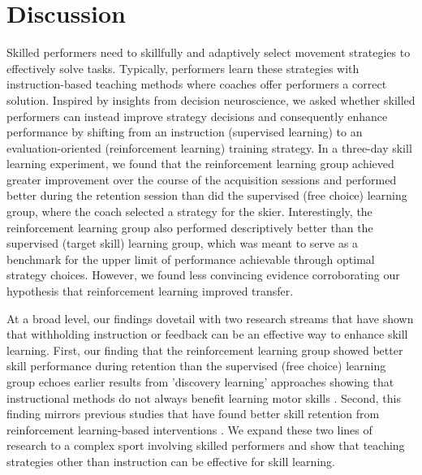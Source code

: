 \documentclass[pdflatex,sn-nature]{sn-jnl}%
\theoremstyle{thmstyleone}%
\theoremstyle{thmstyletwo}%
\theoremstyle{thmstylethree}%
\begin{document}
\section{Discussion}
Skilled performers need to skillfully and adaptively select movement strategies to effectively solve tasks. Typically, performers learn these strategies with instruction-based teaching methods where coaches offer performers a correct solution. Inspired by insights from decision neuroscience, we asked whether skilled performers can instead improve strategy decisions and consequently enhance performance by shifting from an instruction (supervised learning) to an evaluation-oriented (reinforcement learning) training strategy. In a three-day skill learning experiment, we found that the reinforcement learning group achieved greater improvement over the course of the acquisition sessions and performed better during the retention session than did the supervised (free choice) learning group, where the coach selected a strategy for the skier. Interestingly, the reinforcement learning group also performed descriptively better than the supervised (target skill) learning group, which was meant to serve as a benchmark for the upper limit of performance achievable through optimal strategy choices. However, we found less convincing evidence corroborating our hypothesis that reinforcement learning improved transfer.

At a broad level, our findings dovetail with two research streams that have shown that withholding instruction or feedback can be an effective way to enhance skill learning. First, our finding that the reinforcement learning group showed better skill performance during retention than the supervised (free choice) learning group echoes earlier results from 'discovery learning' approaches showing that instructional methods do not always benefit learning motor skills \cite{wulf_instructions_1997, hodges_learning_2001, hodges_role_1999, vereijken_defence_1990}. Second, this finding mirrors previous studies that have found better skill retention from reinforcement learning-based interventions \cite{therrien_effective_2016, truong_error-based_2023, hasson_reinforcement_2015, lior_shmuelof_overcoming_2012}. We expand these two lines of research to a complex sport involving skilled performers and show that teaching strategies other than instruction can be effective for skill learning. 
\end{document}

